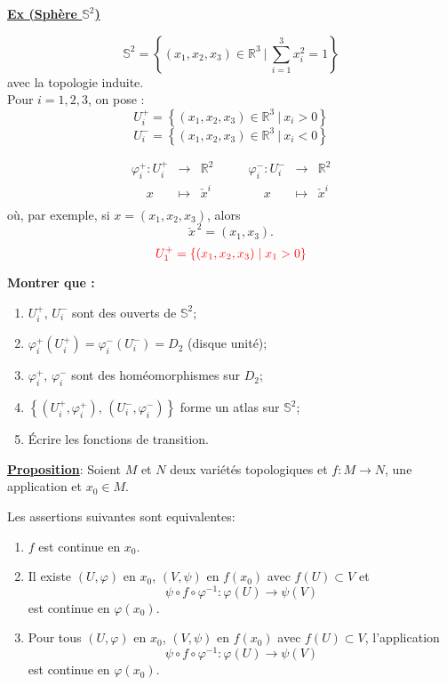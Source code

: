 \documentclass[11pt,a4paper]{article}
\begin{document}
\newpage	
	\underline{\textbf{Ex (Sphère $\mathbb{S}^2$)}}
	
	\[
	\mathbb{S}^2 = \left\lbrace (x_1, x_2, x_3) \in \mathbb{R}^3 ~\Big|~ \sum_{i=1}^3 x_i^2 = 1 \right\rbrace
	\]
	avec la topologie induite.\\
	Pour $i=1,2,3$, on pose :
	\[
	U_i^+ = \left\lbrace (x_1, x_2, x_3) \in \mathbb{R}^3 ~|~ x_i > 0 \right\rbrace
	\]
	\[
	U_i^- = \left\lbrace (x_1, x_2, x_3) \in \mathbb{R}^3 ~|~ x_i < 0 \right\rbrace
	\]
	
	\[
	\begin{array}{ccc}
		\varphi_i^+ : U_i^+ & \longrightarrow & \mathbb{R}^2 \\
		\quad\ x & \longmapsto & \check{x}^{i} \\
	\end{array}
	\qquad
	\begin{array}{ccc}
		\varphi_i^- : U_i^- & \longrightarrow & \mathbb{R}^2 \\
		\quad\ x & \longmapsto & \check{x}^{i} \\
	\end{array}
	\]
	\vspace{-1em}
	où, par exemple, si $x=(x_1, x_2, x_3)$, alors
	\[
	\check{x}^{\,2} = (x_1, x_3).
	\]
	\[
	{\color{red} U_1^+ = \left\{ (x_1, x_2, x_3) \;\middle|\; x_1>0 \right\} }
	\]
	
	\textbf{Montrer que :}
	\begin{enumerate}
		\item $U_i^+,\, U_i^-$ sont des ouverts de $\mathbb{S}^2$;
		\item $\varphi_i^+(U_i^+) = \varphi_i^-(U_i^-) = D_2$ (disque unité);
		\item $\varphi_i^+,\, \varphi_i^-$ sont des homéomorphismes sur $D_2$;
		\item $\left\{ (U_i^+, \varphi_i^+),\, (U_i^-, \varphi_i^-) \right\}$ forme un atlas sur $\mathbb{S}^2$;
		\item Écrire les fonctions de transition.
	\end{enumerate}
	
\newpage 
	\underline{\textbf{Proposition}}: Soient $M$ et $N$ deux variétés topologiques et $ f \colon M \rightarrow N $, une application et $x_0 \in M$. 
	
	Les assertions suivantes sont equivalentes:
	
	\begin{enumerate}
		\item $f$ est continue en $x_0$.
		\item Il existe $(U, \varphi)$ en $x_0$, $(V, \psi)$ en $f(x_0)$ avec $f(U) \subset V$ et
		\[
		\psi \circ f \circ \varphi^{-1} : \varphi(U) \to \psi(V)
		\]
		est continue en $\varphi(x_0)$.
		\item Pour tous $(U, \varphi)$ en $x_0$, $(V, \psi)$ en $f(x_0)$ avec $f(U) \subset V$, l'application
		\[
		\psi \circ f \circ \varphi^{-1} : \varphi(U) \to \psi(V)
		\]
		est continue en $\varphi(x_0)$.
	\end{enumerate}
	
\end{document}
